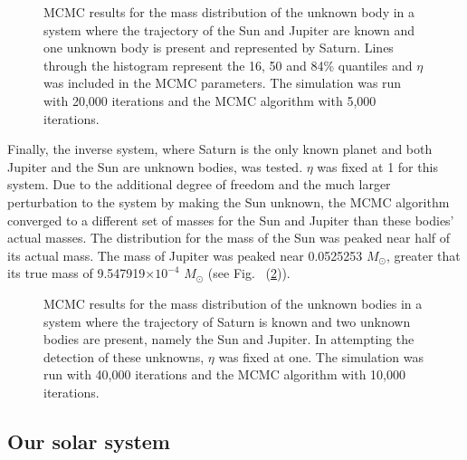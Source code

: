 \documentclass[twocolumn]{aastex63}
\newcommand{\msun}{M_\odot}
\begin{document}
\begin{figure}[ht!]
\caption{MCMC results for the mass distribution of the unknown body in a system where the trajectory of the Sun and Jupiter are known and one unknown body is present and represented by Saturn. Lines through the histogram represent the 16, 50 and 84\% quantiles and $\eta$ was included in the MCMC parameters. The simulation was run with 20,000 iterations and the MCMC algorithm with 5,000 iterations. \label{fig:saturn_eta}}
\end{figure}

Finally, the inverse system, where Saturn is the only known planet and both Jupiter and the Sun are unknown bodies, was tested. $\eta$ was fixed at 1 for this system. Due to the additional degree of freedom and the much larger perturbation to the system by making the Sun unknown, the MCMC algorithm converged to a different set of masses for the Sun and Jupiter than these bodies' actual masses. The distribution for the mass of the Sun was peaked near half of its actual mass. The mass of Jupiter was peaked near 0.0525253 $\msun$, greater that its true mass of 9.547919$\times 10^{-4}$ $\msun$ (see Fig.~ (\ref{fig:sun_jupiter})).

\begin{figure}[ht!]
\caption{MCMC results for the mass distribution of the unknown bodies in a system where the trajectory of Saturn is known and two unknown bodies are present, namely the Sun and Jupiter. In attempting the detection of these unknowns, $\eta$ was fixed at one. The simulation was run with 40,000 iterations and the MCMC algorithm with 10,000 iterations.\label{fig:sun_jupiter}}
\end{figure}

\subsection{Our solar system} \label{ssec:solar_system}
\end{document}
